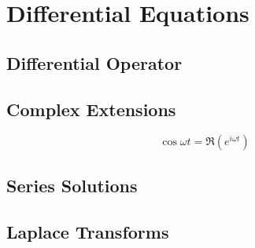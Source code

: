 \chapter{Differential Equations}

\section{Differential Operator}

\section{Complex Extensions}
\[\cos\omega t = \Re(e^{i\omega t})\] 

\section{Series Solutions}

\section{Laplace Transforms}
